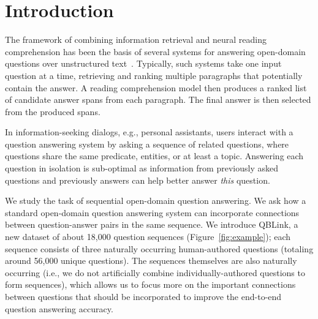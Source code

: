 \section{Introduction}


The framework of combining information retrieval and neural reading
comprehension has been the basis of several systems for answering
open-domain questions over unstructured
text~\cite{chen2017reading,wang2018evidence,clark2018simple,htut2018training}.
Typically, such systems take one input question at a time, retrieving and
ranking multiple paragraphs that potentially contain the answer. A
reading comprehension model then produces a ranked list of candidate
answer spans from each paragraph. The final answer is then selected
from the produced spans.


In information-seeking dialogs, e.g., personal assistants,  
users interact with a question answering system by asking  
a sequence of related questions, where questions share the same
predicate, entities, or at least a topic. 
Answering each question in isolation is sub-optimal as
information from previously asked questions and
previously answers can help better answer
\emph{this} question.


We study the task of sequential open-domain question answering.  We
ask how a standard open-domain question answering system can
incorporate connections between question-answer pairs in the same
sequence. We introduce QBLink, a new dataset of about 18,000 question
sequences (Figure~\ref{fig:example}); each sequence consists of 
three naturally occurring
human-authored questions (totaling around 56,000 unique
questions). The sequences themselves are also naturally occurring
(i.e., we do not artificially combine individually-authored questions to
form sequences), which allows us to focus more on the important
connections between questions that should be incorporated to improve
the end-to-end question answering accuracy.  

